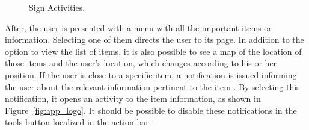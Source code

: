 \begin{figure}[!htb]
	\centering
	\begin{subfigmatrix}{2}
	\end{subfigmatrix}
	\caption[Sign Activities]{Sign Activities.}
	\label{fig:app_sign}
\end{figure}

After, the user is presented with a menu with all the important items or information. Selecting one of them directs the user to its page. In addition to the option to view the list of items, it is also possible to see a map of the location of those items and the user's location, which changes according to his or her position. If the user is close to a specific item, a notification is issued informing the user about the relevant information pertinent to the item . By selecting this notification, it opens an activity to the item information, as shown in Figure~\ref{fig:app_logo}. It should be possible to disable these notifications in the tools button localized in the action bar.


